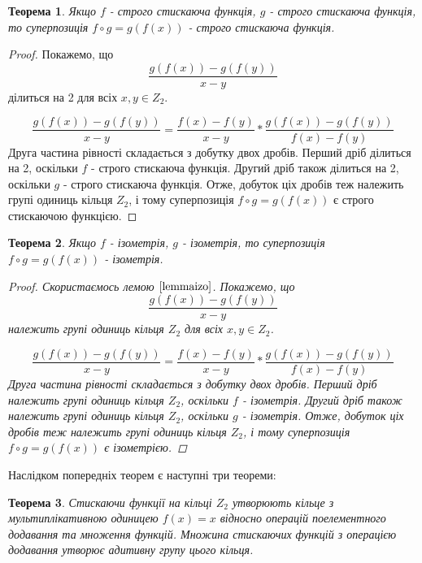 \documentclass[a4paper,12pt]{article} \usepackage{a4wide}
\numberwithin{equation}{subsection}
\newtheorem{theorem}{Теорема}[subsection]
\begin{document}
  \begin{theorem}Якщо $f$ - строго стискаюча функція, $g$ - строго
    стискаюча функція, то суперпозиція $f\circ g=g(f(x))$ - строго
    стискаюча функція.
  \end{theorem}
  \begin{proof}
    Покажемо, що $$\frac{g(f(x))-g(f(y))}{x-y}$$ ділиться на 2 для
    всіх $x,y \in Z_2$.

 $$\frac{g(f(x))-g(f(y))}{x-y}=\frac{f(x)-f(y)}{x-y}*\frac{g(f(x))- g(f(y))}{f(x)-f(y)}$$
 Друга частина рівності складається з добутку двох дробів. Перший дріб
 ділиться на 2, оскільки $f$ - строго стискаюча функція. Другий дріб
 також ділиться на 2, оскільки $g$ - строго стискаюча функція. Отже,
 добуток ціх дробів теж належить групі одиниць кільця $Z_2$, і тому
 суперпозиція $f\circ g=g(f(x))$ є строго стискаючою функцією.
\end{proof}
\begin{theorem} Якщо $f$ - ізометрія, $g$ - ізометрія, то суперпозиція
  $f\circ g=g(f(x))$ - ізометрія.

  \begin{proof}

    Скористаємось лемою $\ref{lemmaizo}$. Покажемо,
    що $$\frac{g(f(x))-g(f(y))}{x-y}$$ належить групі одиниць кільця
    $Z_2$ для всіх $x,y \in Z_2$.

 $$\frac{g(f(x))-g(f(y))}{x-y}=\frac{f(x)-f(y)}{x-y}*\frac{g(f(x))-g(f(y))}{f(x)-f(y)}$$
 Друга частина рівності складається з добутку двох дробів. Перший дріб
 належить групі одиниць кільця $Z_2$, оскільки $f$ - ізометрія. Другий
 дріб також належить групі одиниць кільця $Z_2$, оскільки $g$ -
 ізометрія. Отже, добуток ціх дробів теж належить групі одиниць кільця
 $Z_2$, і тому суперпозиція $f\circ g=g(f(x))$ є ізометрією.
\end{proof}
\end{theorem}
Наслідком попередніх теорем є наступні три теореми:
\begin{theorem}Стискаючи функції на кільці $Z_2$ утворюють кільце з
  мультиплікативною одиницею $f(x)=x$ відносно операцій поелементного
  додавання та множення функцій. Множина стискаючих функцій з
  операцією додавання утворює адитивну групу цього кільця.
\end{theorem}
\end{document}
